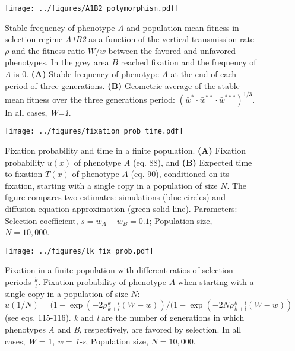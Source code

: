 \documentclass[]{article}
\begin{document}
\begin{figure}
\centering
\texttt{[image: ../figures/A1B2\_polymorphism.pdf]}
\caption{Stable frequency of phenotype \emph{A} and population mean fitness in selection regime
\emph{A1B2} as a function of the vertical transmission rate \(\rho\) and the fitness ratio \(W/w\) between the favored and unfavored phenotypes.
In the grey area \(B\) reached fixation and the frequency of \(A\) is 0.
\textbf{(A)} Stable frequency of phenotype $A$ at the end of each period of three generations.
\textbf{(B)} Geometric average of the stable mean fitness over the three generations period: $(\bar{w}^* \cdot \bar{w}^{**} \cdot \bar{w}^{***})^{1/3}$.
In all cases, \emph{W=1}.}\label{fig:A1B2_polymorphism}
\end{figure}

\begin{figure}
\centering
\texttt{[image: ../figures/fixation\_prob\_time.pdf]}
\caption{Fixation probability and time in a finite population.
\textbf{(A)} Fixation probability \(u(x)\) of phenotype \(A\) (eq. 88), and \textbf{(B)}
Expected time to fixation \(T(x)\) of phenotype \(A\) (eq. 90), conditioned on its
fixation, starting with a single copy in a population of size \(N\). The
figure compares two estimates: simulations (blue circles) and diffusion
equation approximation (green solid line). Parameters: Selection coefficient, \(s=w_A-w_B=0.1\);
Population size, \(N=10,000\).}\label{fixation_prob_time}
\end{figure}

\begin{figure}
\centering
\texttt{[image: ../figures/lk\_fix\_prob.pdf]}
\caption{Fixation in a finite population with different ratios of selection periods \(\frac{k}{l}\). Fixation probability of phenotype $A$ when starting with a single copy in a population of size $N$: $u(1/N) = (1-\exp(-2 \rho \frac{k-l}{k+l}(W-w))/(1-\exp(-2 N \rho \frac{k-l}{k+l}(W-w))$ (see eqs. 115-116).
\emph{k} and \emph{l} are the number of
generations in which phenotypes \emph{A} and \emph{B}, respectively, are favored by
selection. In all cases, \emph{W} = 1, \emph{w} = \emph{1-s}, Population size, \(N=10,000\).} \label{lk_fix_prob}
\end{figure}
\end{document}
